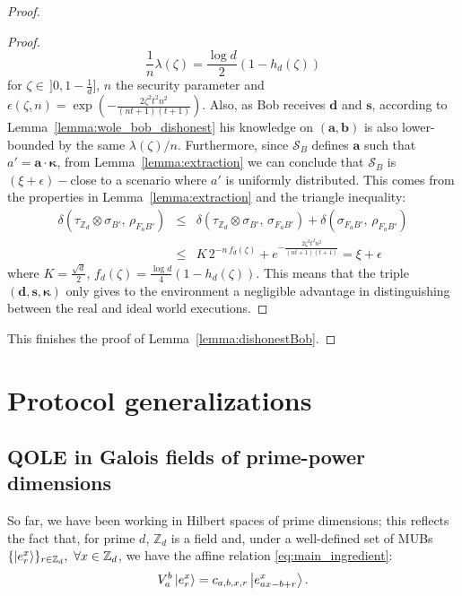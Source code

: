 \begin{proof}
\begin{proof}
$$\frac{1}{n}\lambda(\zeta) = \frac{\log d}{2}(1-h_d(\zeta))$$
for $\zeta\in\,]0, 1-\frac{1}{d}]$, $n$ the security parameter and $\epsilon(\zeta, n) = \exp( -\frac{2 \zeta^2t^2n^2}{(nt+1)(t+1)})$. Also, as Bob receives $\bm{d}$ and $\bm{s}$, according to Lemma~\ref{lemma:wole_bob_dishonest} his knowledge on $(\bm{a}, \bm{b})$ is also lower-bounded by the same $\lambda(\zeta)/n$. Furthermore, since $\mathcal{S}_B$ defines $\bm{a}$ such that $a' = \bm{a} \cdot \bm{\kappa}$, from Lemma~\ref{lemma:extraction} we can conclude that $\mathcal{S}_B$ is $(\xi + \epsilon)-$close to a scenario where $a'$ is uniformly distributed. This comes from the properties in Lemma~\ref{lemma:extraction} and the triangle inequality:
\begin{eqnarray*}
\delta( \tau_{\mathbb{Z}_d} \otimes \sigma_{B'},\, \rho_{F_a B'} ) &\leq& \delta( \tau_{\mathbb{Z}_d} \otimes \sigma_{B'},\, \sigma_{F_{a} B'} ) + \delta( \sigma_{F_{a} B'},\, \rho_{F_a B'} ) \\
&\leq& K\, 2^{-n \, f_d(\zeta)} + e^{ -\frac{2 \zeta^2t^2n^2}{(nt+1)(t+1)}}= \xi + \epsilon
\end{eqnarray*}
where $K = \frac{\sqrt{d}}{2}$, $f_d(\zeta) = \frac{\log d}{4} (1-h_d(\zeta))$. This means that the triple $(\bm{d}, \bm{s}, \bm{\kappa})$ only gives to the environment a negligible advantage in distinguishing between the real and ideal world executions.
\end{proof}

This finishes the proof of Lemma~\ref{lemma:dishonestBob}.

\end{proof}


\section{Protocol generalizations}
\label{sec:protgeneral}

\subsection{QOLE in Galois fields of prime-power dimensions} \label{sec:galois_ext}

So far, we have been working in Hilbert spaces of prime dimensions; this reflects the fact that, for prime $d$,  $\mathbb{Z}_d$ is a field  and, under a well-defined set of MUBs $\{ \ket{e^x_r} \}_{r\in\mathbb{Z}_d},\ \forall x\in\mathbb{Z}_d$, we have the affine relation \eqref{eq:main_ingredient}:
\begin{equation*}
V^b_a \ket{e^x_r} = c_{a, b, x, r} \ket{e^x_{ax - b +r}}.
\end{equation*}

